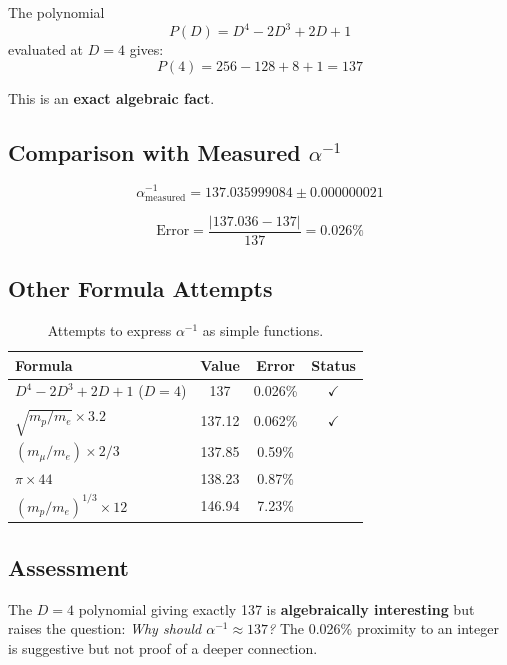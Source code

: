 \documentclass[11pt,a4paper]{article}
\begin{document}
The polynomial
\begin{equation}
P(D) = D^4 - 2D^3 + 2D + 1
\end{equation}
evaluated at $D=4$ gives:
\begin{equation}
P(4) = 256 - 128 + 8 + 1 = \boxed{137}
\end{equation}

This is an \textbf{exact algebraic fact}.

\subsection{Comparison with Measured $\alpha^{-1}$}

\begin{equation}
\alpha^{-1}_{\text{measured}} = 137.035999084 \pm 0.000000021
\end{equation}

\begin{equation}
\text{Error} = \frac{|137.036 - 137|}{137} = 0.026\%
\end{equation}

\subsection{Other Formula Attempts}

\begin{table}[h]
\centering
\begin{tabular}{|l|c|c|c|}
\hline
Formula & Value & Error & Status \\
\hline
$D^4 - 2D^3 + 2D + 1$ ($D=4$) & 137 & 0.026\% & $\checkmark$ \\
$\sqrt{m_p/m_e} \times 3.2$ & 137.12 & 0.062\% & $\checkmark$ \\
$(m_\mu/m_e) \times 2/3$ & 137.85 & 0.59\% & \\
$\pi \times 44$ & 138.23 & 0.87\% & \\
$(m_p/m_e)^{1/3} \times 12$ & 146.94 & 7.23\% & \\
\hline
\end{tabular}
\caption{Attempts to express $\alpha^{-1}$ as simple functions.}
\end{table}

\subsection{Assessment}

The $D=4$ polynomial giving exactly 137 is \textbf{algebraically interesting} but raises the question: \textit{Why should $\alpha^{-1} \approx 137$?} The 0.026\% proximity to an integer is suggestive but not proof of a deeper connection.
\end{document}
